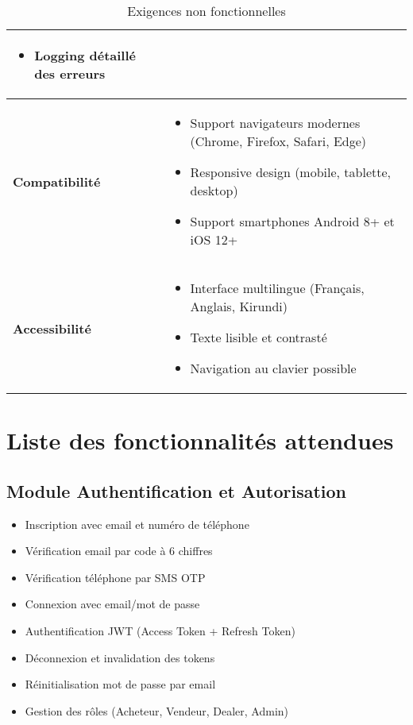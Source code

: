 \documentclass[12pt,a4paper]{report}
\begin{document}
\begin{table}[H]
\begin{tabular}{|p{2.5cm}|p{10cm}|}
\begin{itemize}[leftmargin=*,noitemsep]
    \item Logging détaillé des erreurs
\end{itemize} \\
\hline
\textbf{Compatibilité} &
\begin{itemize}[leftmargin=*,noitemsep]
    \item Support navigateurs modernes (Chrome, Firefox, Safari, Edge)
    \item Responsive design (mobile, tablette, desktop)
    \item Support smartphones Android 8+ et iOS 12+
\end{itemize} \\
\hline
\textbf{Accessibilité} &
\begin{itemize}[leftmargin=*,noitemsep]
    \item Interface multilingue (Français, Anglais, Kirundi)
    \item Texte lisible et contrasté
    \item Navigation au clavier possible
\end{itemize} \\
\hline
\end{tabular}
\caption{Exigences non fonctionnelles}
\end{table}

\section{Liste des fonctionnalités attendues}

\subsection{Module Authentification et Autorisation}
\begin{itemize}
    \item Inscription avec email et numéro de téléphone
    \item Vérification email par code à 6 chiffres
    \item Vérification téléphone par SMS OTP
    \item Connexion avec email/mot de passe
    \item Authentification JWT (Access Token + Refresh Token)
    \item Déconnexion et invalidation des tokens
    \item Réinitialisation mot de passe par email
    \item Gestion des rôles (Acheteur, Vendeur, Dealer, Admin)
\end{itemize}
\end{document}
